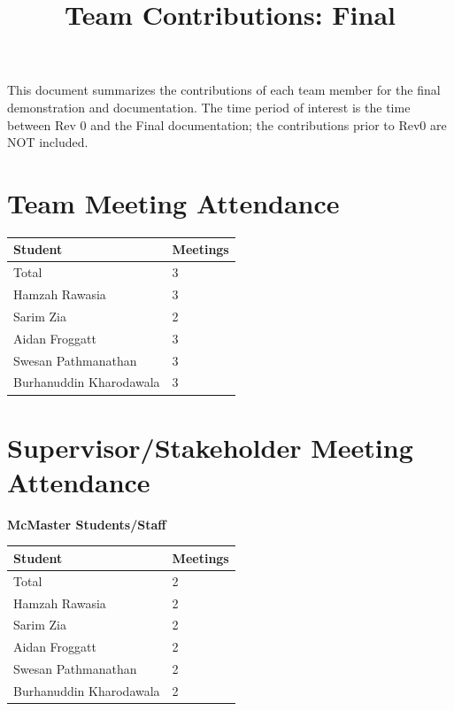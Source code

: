 \documentclass{article}
\title{Team Contributions: Final\\\progname}
\author{\authname}
\date{}
\begin{document}
\maketitle

This document summarizes the contributions of each team member for the final
demonstration and documentation.  The time period of interest is the time
between Rev 0 and the Final documentation; the contributions prior to Rev0 are
NOT included.

\section{Team Meeting Attendance}
    
\begin{table}[H]
\centering
\begin{tabular}{ll}
\toprule
\textbf{Student} & \textbf{Meetings}\\
\midrule
Total & 3\\
Hamzah Rawasia & 3\\
Sarim Zia & 2\\
Aidan Froggatt & 3\\
Swesan Pathmanathan & 3\\
Burhanuddin Kharodawala & 3\\
\bottomrule
\end{tabular}
\end{table}

\section{Supervisor/Stakeholder Meeting Attendance}

\noindent \textbf{McMaster Students/Staff}

\begin{table}[H]
\centering
\begin{tabular}{ll}
\toprule
\textbf{Student} & \textbf{Meetings}\\
\midrule
Total & 2\\
Hamzah Rawasia & 2\\
Sarim Zia & 2\\
Aidan Froggatt & 2\\
Swesan Pathmanathan & 2\\
Burhanuddin Kharodawala & 2\\
\bottomrule
\end{tabular}
\end{table}

\end{document}
